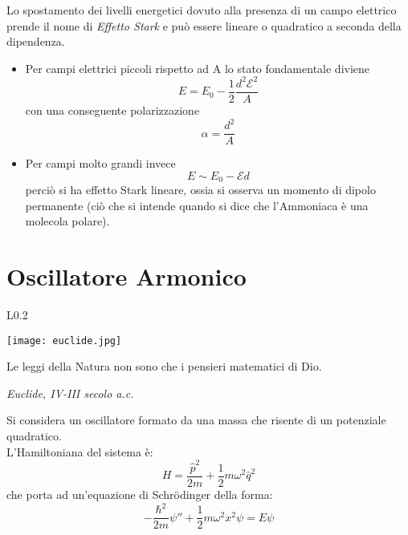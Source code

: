 \documentclass[twoside]{article}
\begin{document}
Lo spostamento dei livelli energetici dovuto alla presenza di un campo elettrico prende il nome di \textit{Effetto Stark} e può essere lineare o quadratico a seconda della dipendenza.
\\
\begin{itemize}
    \item Per campi elettrici piccoli rispetto ad A lo stato fondamentale diviene
    \begin{equation}
        E=E_0 -\frac{1}{2}\frac{d^2\mathcal{E}^2}{A}
    \end{equation}
    con una conseguente polarizzazione 
    \begin{equation*}
        \alpha=\frac{d^2}{A}
    \end{equation*}
    \item Per campi molto grandi invece
    \begin{equation}
        E\sim E_0 -\mathcal{E}d
    \end{equation}
    perciò si ha effetto Stark lineare, ossia si osserva un momento di dipolo permanente (ciò che si intende quando si dice che l'Ammoniaca è una molecola polare).
\end{itemize}



\newpage

\section{Oscillatore Armonico}

\begin{wrapfigure}[4]{L}{0.2\textwidth}
  \begin{center}
    \texttt{[image: euclide.jpg]}
  \end{center}
\end{wrapfigure}\leavevmode

\vspace{10mm}
\epigraph{Le leggi della Natura non sono che i pensieri matematici di Dio.}{\textit{Euclide, IV-III secolo a.c.}}
\vspace{10mm}

Si considera un oscillatore formato da una massa che risente di un potenziale quadratico. \\
L'Hamiltoniana del sistema è:
\begin{equation} \label{7.0.1}
    H=\frac{\hat{p}^2}{2m}+\frac{1}{2}m\omega^2\hat{q}^2
\end{equation}
che porta ad un'equazione di Schr\"odinger della forma:
\begin{equation}
    -\frac{\hbar^2}{2m}\psi'' + \frac{1}{2}m\omega^2 x^2 \psi = E\psi
\end{equation}
\end{document}
